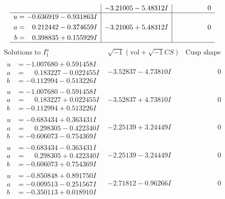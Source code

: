 \documentclass[1p]{elsarticle_modified}
\theoremstyle{definition}
\newcommand{\I}{\sqrt{-1}}
\begin{document}
$$\begin{array}{c|c|c}
 & -3.21005 - 5.48312 I & \phantom{-0.000000 } 0 \\ \hline\begin{aligned}
u &= -0.636919 - 0.931863 I \\
a &= \phantom{-}0.212442 - 0.374659 I \\
b &= \phantom{-}0.398835 + 0.155929 I\end{aligned}
 & -3.21005 + 5.48312 I & \phantom{-0.000000 } 0\\
 \hline 
 \end{array}$$\newpage$$\begin{array}{c|c|c}  
\text{Solutions to }I^u_{1}& \I (\text{vol} + \sqrt{-1}CS) & \text{Cusp shape}\\
 \hline 
\begin{aligned}
u &= -1.007680 + 0.591458 I \\
a &= \phantom{-}0.183227 - 0.022455 I \\
b &= -0.112994 - 0.513226 I\end{aligned}
 & -3.52837 - 4.73810 I & \phantom{-0.000000 } 0 \\ \hline\begin{aligned}
u &= -1.007680 - 0.591458 I \\
a &= \phantom{-}0.183227 + 0.022455 I \\
b &= -0.112994 + 0.513226 I\end{aligned}
 & -3.52837 + 4.73810 I & \phantom{-0.000000 } 0 \\ \hline\begin{aligned}
u &= -0.683434 + 0.363431 I \\
a &= \phantom{-}0.298305 - 0.422340 I \\
b &= -0.606073 - 0.754369 I\end{aligned}
 & -2.25139 + 3.24449 I & \phantom{-0.000000 } 0 \\ \hline\begin{aligned}
u &= -0.683434 - 0.363431 I \\
a &= \phantom{-}0.298305 + 0.422340 I \\
b &= -0.606073 + 0.754369 I\end{aligned}
 & -2.25139 - 3.24449 I & \phantom{-0.000000 } 0 \\ \hline\begin{aligned}
u &= -0.850848 + 0.891750 I \\
a &= -0.009513 - 0.251567 I \\
b &= -0.350113 + 0.018910 I\end{aligned}
 & -2.71812 - 0.96266 I & \phantom{-0.000000 } 0 \\ \hline\begin{aligned}

\end{aligned}
\end{array}$$
\end{document}
